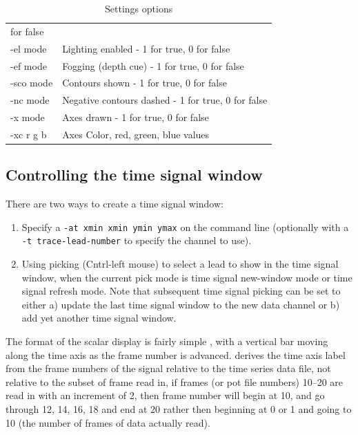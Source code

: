 \begin{table}[htbp]
\begin{center}
\begin{tabular}{|l|p{4in}|}
        for false \\ 
        -el mode        &       Lighting enabled - 1 for true, 0 for false \\
        -ef mode        &       Fogging (depth cue) - 1 for true, 0 for false \\
        -sco mode       &       Contours shown - 1 for true, 0 for false \\
        -nc mode        &       Negative contours dashed - 1 for true, 0
        for false \\ 
        -x mode         &       Axes drawn - 1 for true, 0 for false \\
        -xc r g b       &       Axes Color, red, green, blue values\\ \hline
\end{tabular}
\end{center}
\caption{\label{table:settingsoptions} Settings options}

\end{table}


\subsection{Controlling the time signal window}
\label{sec:control-scalar} 


There are two ways to create a time signal window:
%
\begin{enumerate}
  \item Specify a \texttt{-at xmin xmin ymin ymax} on the command line
        (optionally with a \texttt{-t trace-lead-number} to specify the
        channel to use).
      \item Using picking (Cntrl-left mouse) to select a lead to show in
        the time signal window, when the current pick mode is time signal
        new-window mode or time signal refresh mode.  Note that subsequent
        time signal picking can be set to either a) update the last time
        signal window to the new data channel or b) add yet another time
        signal window.
\end{enumerate}
%

The format of the scalar display is fairly simple 
, with a vertical bar moving along the time axis as the frame number is
advanced.  \map{} derives the time axis label from the frame numbers of the
signal relative to the time series data file, not relative to the subset of
frame read in, \ie{} if frames (or pot file numbers) 10--20 are read in
with an increment of 2, then frame number will begin at 10, and go through
12, 14, 16, 18 and end at 20 rather then beginning at 0 or 1 and going to 10
(the number of frames of data actually read).

